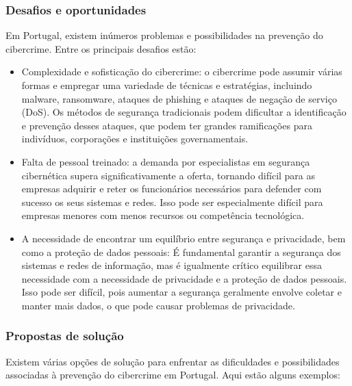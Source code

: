 \subsubsection{Desafios e oportunidades}

Em Portugal, existem inúmeros problemas e possibilidades na prevenção do cibercrime. Entre os principais desafios estão:

\begin{itemize}
  \item Complexidade e sofisticação do cibercrime: o cibercrime pode assumir várias formas e empregar uma variedade de técnicas e estratégias, incluindo malware, ransomware, ataques de phishing e ataques de negação de serviço (DoS). Os métodos de segurança tradicionais podem dificultar a identificação e prevenção desses ataques, que podem ter grandes ramificações para indivíduos, corporações e instituições governamentais.
  \item Falta de pessoal treinado: a demanda por especialistas em segurança cibernética supera significativamente a oferta, tornando difícil para as empresas adquirir e reter os funcionários necessários para defender com sucesso os seus sistemas e redes. Isso pode ser especialmente difícil para empresas menores com menos recursos ou competência tecnológica.
  \item A necessidade de encontrar um equilíbrio entre segurança e privacidade, bem como a proteção de dados pessoais: É fundamental garantir a segurança dos sistemas e redes de informação, mas é igualmente crítico equilibrar essa necessidade com a necessidade de privacidade e a proteção de dados pessoais. Isso pode ser difícil, pois aumentar a segurança geralmente envolve coletar e manter mais dados, o que pode causar problemas de privacidade.
\end{itemize}

\subsubsection{Propostas de solução}

Existem várias opções de solução para enfrentar as dificuldades e possibilidades associadas à prevenção do cibercrime em Portugal. Aqui estão alguns exemplos:

